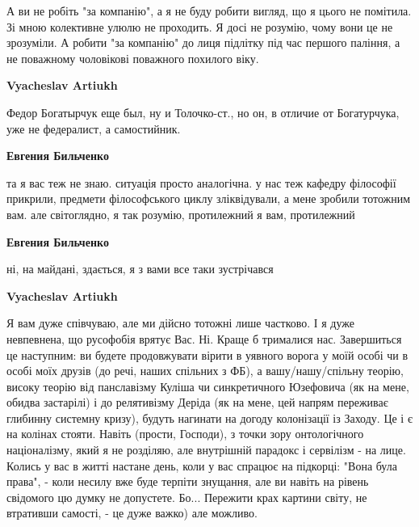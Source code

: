\begin{itemize}
\begin{itemize}
А ви не робіть "за компанію", а я не буду робити вигляд, що я цього не
помітила. Зі мною колективне улюлю не проходить. Я досі не розумію, чому вони
це не зрозуміли. А робити "за компанію" до лиця підлітку під час першого
паління, а не поважному чоловікові поважного похилого віку.


 
\textbf{Vyacheslav Artiukh} 

Федор Богатырчук еще был, ну и Толочко-ст., но он, в отличие от Богатурчука,
уже не федералист, а самостийник.


 
\textbf{Евгения Бильченко} 

та я вас теж не знаю. ситуація просто аналогічна. у нас теж кафедру філософії
прикрили, предмети філософського циклу зліквідували, а мене зробили тотожним
вам. але світоглядно, я так розумію, протилежний я вам, протилежний

 
\textbf{Евгения Бильченко} 

ні, на майдані, здається, я з вами все таки зустрічався


 
\textbf{Vyacheslav Artiukh} 

Я вам дуже співчуваю, але ми дійсно тотожні лише частково. І я дуже невпевнена,
що русофобія врятує Вас. Ні. Краще б трималися нас. Завершиться це наступним:
ви будете продовжувати вірити в уявного ворога у моїй особі чи в особі моїх
друзів (до речі, наших спільних з ФБ), а вашу/нашу/спільну теорію, високу
теорію від панславізму Куліша чи синкретичного Юзефовича (як на мене, обидва
застарілі) і до релятивізму Деріда (як на мене, цей напрям переживає глибинну
системну кризу), будуть нагинати на догоду колонізації із Заходу. Це і є на
колінах стояти. Навіть (прости, Господи), з точки зору онтологічного
націоналізму, який я не розділяю, але внутрішній парадокс і сервілізм - на
лице. Колись у вас в житті настане день, коли у вас спрацює на підкорці: "Вона
була права", - коли несилу вже буде терпіти знущання, але ви навіть на рівень
свідомого цю думку не допустете. Бо... Пережити крах картини світу, не
втративши самості, - це дуже важко) але можливо.


\end{itemize}
\end{itemize}
